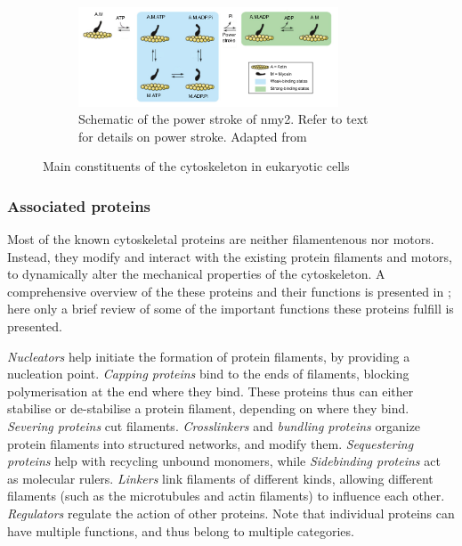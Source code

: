 \begin{figure}[p]
\begin{subfigure}{\textwidth}
    \label{subfig:cytoskeletonMainConsituents-myosin}
\end{subfigure}
\hfill
\begin{subfigure}{\textwidth}
    \centering
    \includegraphics[width=0.85\textwidth]{Introduction/FigureCytoskeleton/powerstroke.pdf}
    \caption{Schematic of the power stroke of \acs{nmy2}. Refer to text for details on power stroke. Adapted from \cite{de2004relating}}
    \label{subfig:cytoskeletonMainConsituents-powerstroke}
\end{subfigure}

\caption[Main constituents of the cytoskeleton]{Main constituents of the cytoskeleton in eukaryotic cells}
\label{fig:cytoskeletonMainConsituents}

\end{figure}

\subsubsection{Associated proteins}\label{subsubsec:AssociatedProteinsCytoskeleton}
Most of the known cytoskeletal proteins are neither filamentenous nor motors. Instead, they modify and interact with the existing protein filaments and motors, to dynamically alter the mechanical properties of the cytoskeleton. A comprehensive overview of the these proteins and their functions is presented in \cite{chaffey2003alberts,pollard1986actin}; here only a brief review of some of the important functions these proteins fulfill is presented.

\textit{Nucleators} help initiate the formation of protein filaments, by providing a nucleation point. \textit{Capping proteins} bind to the ends of filaments, blocking polymerisation at the end where they bind. These proteins thus can either stabilise or de-stabilise a protein filament, depending on where they bind. \textit{Severing proteins} cut filaments. \textit{Crosslinkers} and \textit{bundling proteins} organize protein filaments into structured networks, and modify them. \textit{Sequestering proteins} help with recycling unbound monomers, while \textit{Sidebinding proteins} act as molecular rulers. \textit{Linkers} link filaments of different kinds, allowing different filaments (such as the microtubules and actin filaments) to influence each other. \textit{Regulators} regulate the action of other proteins. Note that individual proteins can have multiple functions, and thus belong to multiple categories.

